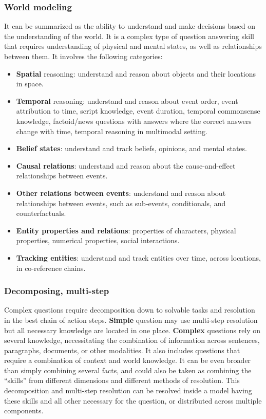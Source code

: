 \documentclass[acmsmall]{acmart}
\begin{document}
\subsubsection{\textbf{World modeling}} \citep{liLanguageModelingLatent2022}
It can be summarized as  the ability to understand and make decisions based on the understanding of the world. It is a complex type of question answering skill that requires understanding of physical and mental states, as well as relationships between them. It involves the following categories: 
\begin{itemize}
    \item \textbf{Spatial} reasoning: understand and reason about objects and their locations in space. 
    \item \textbf{Temporal} reasoning: understand and reason about event order, event attribution to time, script knowledge, event duration, temporal commonsense knowledge, factoid/news questions with answers where the correct answers change with time, temporal reasoning in multimodal setting.
    \item \textbf{Belief states}: understand and track beliefs, opinions, and mental states.
    \item \textbf{Causal relations}: understand and reason about the cause-and-effect relationships between events.
    \item \textbf{Other relations between events}: understand and reason about relationships between events, such as sub-events, conditionals, and counterfactuals.
    \item \textbf{Entity properties and relations}: properties of characters, physical properties, numerical properties, social interactions.
    \item \textbf{Tracking entities}: understand and track entities over time, across locations, in co-reference chains.
\end{itemize}

\subsubsection{\textbf{Decomposing, multi-step}}
Complex questions require decomposition down to solvable tasks and resolution in the best chain of action steps. \textbf{Simple} question may use multi-step resolution but all necessary knowledge are located in one place. \textbf{Complex} questions rely on several knowledge, necessitating the combination of information across sentences, paragraphs, documents, or other modalities. It also includes questions that require a combination of context and world knowledge. It can be even broader than simply combining several facts, and could also be taken as combining the “skills” from different dimensions and different methods of resolution. This decomposition and multi-step resolution can be resolved inside a model having these skills and all other necessary for the question, or distributed across multiple components.
\end{document}
